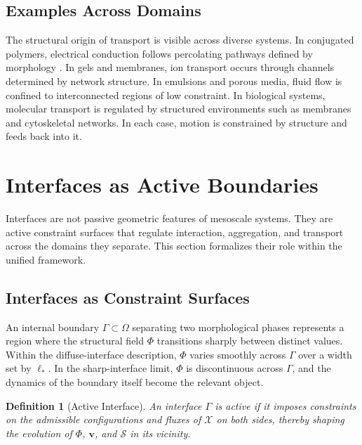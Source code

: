 \documentclass[11pt, a4paper, twocolumn]{article}
\newtheorem{definition}{Definition}[section]
\newcommand{\X}{\mathcal{X}}
\newcommand{\Sfield}{\mathcal{S}}
\begin{document}
\subsection{Examples Across Domains}

The structural origin of transport is visible across diverse systems. In
conjugated polymers, electrical conduction follows percolating pathways defined
by morphology \cite{newbloom2011,xu2026}. In gels and membranes, ion transport
occurs through channels determined by network structure. In emulsions and porous
media, fluid flow is confined to interconnected regions of low constraint.
In biological systems, molecular transport is regulated by structured environments
such as membranes and cytoskeletal networks. In each case, motion is constrained
by structure and feeds back into it.

\section{Interfaces as Active Boundaries}

Interfaces are not passive geometric features of mesoscale systems. They are
active constraint surfaces that regulate interaction, aggregation, and transport
across the domains they separate. This section formalizes their role within the
unified framework.

\subsection{Interfaces as Constraint Surfaces}

An internal boundary $\Gamma \subset \Omega$ separating two morphological phases
represents a region where the structural field $\Phi$ transitions sharply between
distinct values. Within the diffuse-interface description, $\Phi$ varies smoothly
across $\Gamma$ over a width set by $\ell_*$. In the sharp-interface limit, $\Phi$
is discontinuous across $\Gamma$, and the dynamics of the boundary itself become
the relevant object.

\begin{definition}[Active Interface]
An interface $\Gamma$ is active if it imposes constraints on the admissible
configurations and fluxes of $\X$ on both sides, thereby shaping the evolution
of $\Phi$, $\mathbf{v}$, and $\Sfield$ in its vicinity.
\end{definition}
\end{document}
